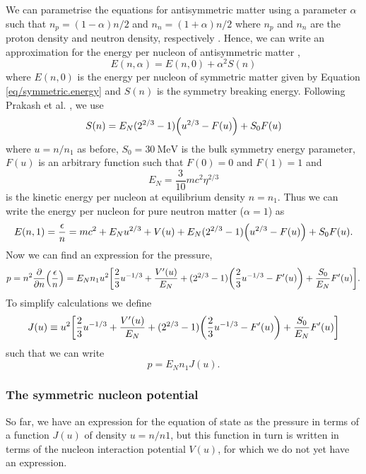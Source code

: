 \documentclass[draft,11pt]{article}
\theoremstyle{definition}
\theoremstyle{remark}
\begin{document}
            We can parametrise the equations for antisymmetric matter using a parameter $\alpha$ such that $n_{p}=(1-\alpha)n/2$ and $n_{n}=(1+\alpha)n/2$ where $n_{p}$ and $n_{n}$ are the proton density and neutron density, respectively \parencite{silbar.reddy.2004/neutron.stars}. Hence, we can write an approximation for the energy per nucleon of antisymmetric matter \parencite{prakash.ainsworth.lattimer.1988/eos}, \begin{equation}\label{eq/antisymmetric.energy}E(n,\alpha)=E(n,0)+\alpha^{2}S(n)\end{equation} where $E(n,0)$ is the energy per nucleon of symmetric matter given by Equation \ref{eq/symmetric.energy} and $S(n)$ is the symmetry breaking energy. Following Prakash et al. \cite{prakash.ainsworth.lattimer.1988/eos}, we use \begin{equation}\label{eq/symmetry.breaking}S(n)=E_{N}(2^{2/3}-1)\qty(u^{2/3}-F(u))+S_{0}F(u)\end{equation} where $u=n/n_{1}$ as before, $S_{0}=\SI{30}{\mega\electronvolt}$ \parencite{prakash.lattimer.2001/ns.structure.eos} is the bulk symmetry energy parameter, $F(u)$ is an arbitrary function such that $F(0)=0$ and $F(1)=1$ and \[E_{N}=\frac{3}{10}mc^{2}\eta^{2/3}\] is the kinetic energy per nucleon at equilibrium density $n=n_{1}$. Thus we can write the energy per nucleon for pure neutron matter ($\alpha=1$) as \[E(n,1)=\frac{\epsilon}{n}=mc^{2}+E_{N}u^{2/3}+V(u)+E_{N}(2^{2/3}-1)\qty(u^{2/3}-F(u))+S_{0}F(u).\] Now we can find an expression for the pressure, \[p=n^{2}\pdv{n}\qty(\frac{\epsilon}{n})=E_{N}n_{1}u^{2}\qty[\frac{2}{3}u^{-1/3}+\frac{V'(u)}{E_{N}}+(2^{2/3}-1)\qty(\frac{2}{3}u^{-1/3}-F'(u))+\frac{S_{0}}{E_{N}}F'(u)].\] To simplify calculations we define \[J(u)\equiv u^{2}\qty[\frac{2}{3}u^{-1/3}+\frac{V'(u)}{E_{N}}+(2^{2/3}-1)\qty(\frac{2}{3}u^{-1/3}-F'(u))+\frac{S_{0}}{E_{N}}F'(u)]\] such that we can write \[p=E_{N}n_{1}J(u).\]
            
            \subsubsection{The symmetric nucleon potential}\label{sec/symmetric.potential}
                So far, we have an expression for the equation of state as the pressure in terms of a function $J(u)$ of density $u=n/n1$, but this function in turn is written in terms of the nucleon interaction potential $V(u)$, for which we do not yet have an expression.
                
\end{document}
